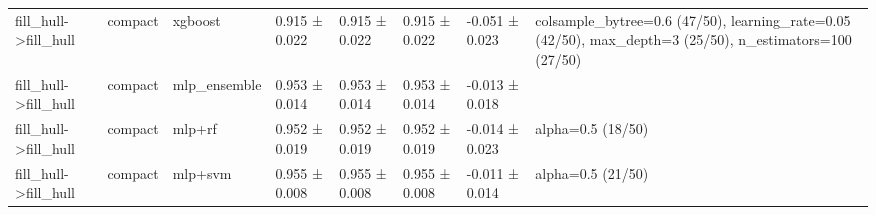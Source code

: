 \begin{tabular}{llllllll}
fill\_hull->fill\_hull & compact & xgboost & 0.915 ± 0.022 & 0.915 ± 0.022 & 0.915 ± 0.022 & -0.051 ± 0.023 & colsample\_bytree=0.6 (47/50), learning\_rate=0.05 (42/50), max\_depth=3 (25/50), n\_estimators=100 (27/50) \\
fill\_hull->fill\_hull & compact & mlp\_ensemble & 0.953 ± 0.014 & 0.953 ± 0.014 & 0.953 ± 0.014 & -0.013 ± 0.018 &  \\
fill\_hull->fill\_hull & compact & mlp+rf & 0.952 ± 0.019 & 0.952 ± 0.019 & 0.952 ± 0.019 & -0.014 ± 0.023 & alpha=0.5 (18/50) \\
fill\_hull->fill\_hull & compact & mlp+svm & 0.955 ± 0.008 & 0.955 ± 0.008 & 0.955 ± 0.008 & -0.011 ± 0.014 & alpha=0.5 (21/50) \\
\bottomrule
\end{tabular}
